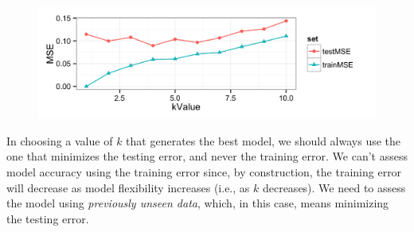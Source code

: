 \documentclass[11pt]{exam} %
\newenvironment{code}%
   {\par\noindent\adjustbox{margin=1ex,bgcolor=shadecolor,margin=0ex \medskipamount}\bgroup\minipage\linewidth\verbatim}%
   {\endverbatim\endminipage\egroup}
\begin{document}
\begin{questions}
\begin{parts}
\begin{figure}[H]
	\centering
	\includegraphics[width=6in]{5d.png}
\end{figure}

In choosing a value of $k$ that generates the best model, we should always use the one that minimizes the testing error, and never the training error. We can't assess model accuracy using the training error since, by construction, the training error will decrease as model flexibility increases (i.e., as $k$ decreases). We need to assess the model using \textit{previously unseen data}, which, in this case, means minimizing the testing error.

\end{parts}






\end{questions}

\end{document}
